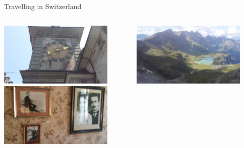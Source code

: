 \documentclass{beamer}
\begin{document}
\begin{frame}{Travelling in Switzerland}
\centering
\begin{columns}[onlytextwidth]
\centering
  \begin{column}{0.5\textwidth}
  \centering
  \includegraphics[height=0.4\textheight, width=0.85\textwidth]{figures/pr1.jpg} \\
  \centering
 \includegraphics[height=0.4\textheight, width=0.85\textwidth]{figures/pr2.jpg}\\
  \end{column}
  \centering
  \begin{column}{0.5\textwidth}
  \centering
  \includegraphics[height=0.4\textheight, width=0.85\textwidth]{figures/pr3.jpg} \\

\end{column}
\end{columns}
\end{frame}
\end{document}
